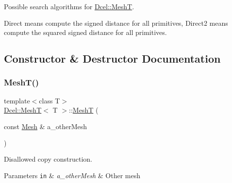Possible search algorithms for \hyperlink{classDcel_1_1MeshT}{Dcel\+::\+MeshT}. 

Direct means compute the signed distance for all primitives, Direct2 means compute the squared signed distance for all primitives. 

\subsection{Constructor \& Destructor Documentation}
\mbox{\label{classDcel_1_1MeshT_aa055e10c62778ba629b3f9c849338e03}} 
\subsubsection{\texorpdfstring{Mesh\+T()}{MeshT()}\hspace{0.1cm}{\footnotesize\ttfamily [1/2]}}
{\footnotesize\ttfamily template$<$class T$>$ \\
\hyperlink{classDcel_1_1MeshT}{Dcel\+::\+MeshT}$<$ T $>$\+::\hyperlink{classDcel_1_1MeshT}{MeshT} (\begin{DoxyParamCaption}\item[{const \hyperlink{classDcel_1_1MeshT_abe9db973f4510ccb36e20ecfa9223926}{Mesh} \&}]{a\+\_\+other\+Mesh }\end{DoxyParamCaption})\hspace{0.3cm}{\ttfamily [delete]}}



Disallowed copy construction. 


\begin{DoxyParams}[1]{Parameters}
\mbox{\tt in}  & {\em a\+\_\+other\+Mesh} & Other mesh \\
\hline
\end{DoxyParams}
\mbox{\label{classDcel_1_1MeshT_a7468e3630893d64a71a7c2347496576b}} 
